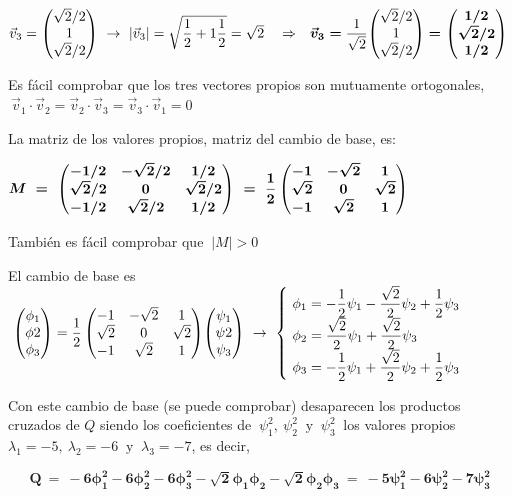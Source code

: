 $\vec v_3=\mqty( \sqrt{2}/2 \\ 1 \\ \sqrt{2}/2) \ \to \ |\vec v_3|=\sqrt{\dfrac 1 2 + 1 \dfrac 1 2 }=\sqrt{2} \quad \Rightarrow \quad \boldsymbol{\vec v_3=} \dfrac 1{\sqrt{2}}\mqty( \sqrt{2}/2 \\ 1 \\ \sqrt{2}/2) \boldsymbol{=\mqty(1/2\\ \sqrt{2}/2 \\1/2)}$

Es fácil comprobar que los tres vectores propios son mutuamente ortogonales, $\ \vec v_1 \cdot \vec v_2=\vec v_2 \cdot \vec v_3=\vec v_3 \cdot \vec v_1=0$

La matriz de los valores propios, matriz del cambio de base, es:

$\boldsymbol{M \ = \ 
\mqty(
-1/2 & -\sqrt{2}/2 & 1/2 \\
\sqrt{2}/2 & 0 & \sqrt{2}/2 \\
-1/2 & \sqrt{2}/2 & 1/2
)
\ = \ \dfrac 1 2 \, \mqty( -1&-\sqrt 2 & 1 \\ \sqrt 2 & 0 & \sqrt 2 \\ -1 & \sqrt 2 & 1 ) }$

También es fácil comprobar que $\ |M|>0$

El cambio de base es $\ \mqty(\phi_1\\ \phi2 \\ \phi_3)= \dfrac 1 2 \, \mqty( -1&-\sqrt 2 & 1 \\ \sqrt 2 & 0 & \sqrt 2 \\ -1 & \sqrt 2 & 1 ) \mqty(\psi_1\\ \psi2 \\ \psi_3) \ \to \ \begin{cases} \ \phi_1=-\dfrac 1 2 \psi_1 - \dfrac{\sqrt{2}}{2} \psi_2 + \dfrac 1 2 \psi_3 \\ \ \phi_2=\dfrac{\sqrt{2}}{2} \psi_1+\dfrac{\sqrt{2}}{2}\psi_3 \\ \ \phi_3= -\dfrac 1 2 \psi_1 + \dfrac{\sqrt{2}}{2} \psi_2+\dfrac 1 2 \psi_3 \end{cases}$

Con este cambio de base (se puede comprobar) desaparecen los productos cruzados de $Q$ siendo los coeficientes de $\ \psi_1^2,\ \psi_2^2 \ \text{ y } \ \psi_3^2 \ $ los valores propios $\lambda_1=-5,\ \lambda_2=-6 \ \text{ y } \ \lambda_3=-7$, es decir,

$$\boldsymbol{ Q \ = \ -6\phi_1^2-6\phi_2^2-6\phi_3^2-\sqrt{2}\phi_1\phi_2	-\sqrt{2}\phi_2\phi_3 \ = \ -5\psi_1^2-6\psi_2^2-7\psi_3^2}$$


